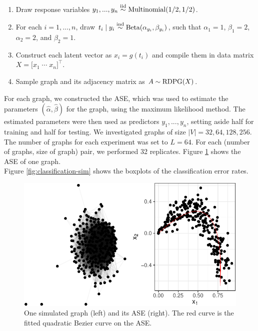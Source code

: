 \documentclass[12pt]{article}
\providecommand{\tightlist}{%
  \setlength{\itemsep}{0pt}\setlength{\parskip}{0pt}}
\begin{document}
\begin{enumerate}
\def\labelenumi{\arabic{enumi}.}
\tightlist
\item
  Draw response variables \(y_1, ..., y_n \stackrel{\mathrm{iid}}{\sim} \mathrm{Multinomial}(1/2, 1/2)\).
\item
  For each \(i = 1, ..., n\), draw
  \(t_i \mid y_i \stackrel{\mathrm{ind}}{\sim} \mathrm{Beta}(\alpha_{y_i}, \beta_{y_i})\), such
  that \(\alpha_1 = 1\), \(\beta_1 = 2\), \(\alpha_2 = 2\), and
  \(\beta_2 = 1\).
\item
  Construct each latent vector as \(x_i = g(t_i)\) and compile them in
  data matrix \(X = \bigl[ x_1 \; \cdots \; x_n \bigr]^\top\).
\item
  Sample graph and its adjacency matrix as \(A \sim \mathrm{RDPG}(X)\).
\end{enumerate}

For each graph, we constructed the ASE, which was used to estimate the
parameters \((\hat{\alpha}, \hat{\beta})\) for the graph, using the
maximum likelihood method. The estimated parameters were then used as
predictors \(y_1, ..., y_n\), setting aside half for training and half
for testing. We investigated graphs of size \(|V| = 32, 64, 128, 256\).
The number of graphs for each experiment was set to \(L = 64\). For each
(number of graphs, size of graph) pair, we performed 32 replicates.
Figure \ref{fig:class-sim-ase} shows the ASE of one graph.\\
Figure \ref{fig:classification-sim} shows the boxplots of the
classification error rates.

\begin{figure}[H]

{\centering \includegraphics{draft_files/figure-latex/class-sim-ase-1} 

}

\caption{One simulated graph (left) and its ASE (right). The red curve is the fitted quadratic Bezier curve on the ASE.}\label{fig:class-sim-ase}
\end{figure}
\end{document}
